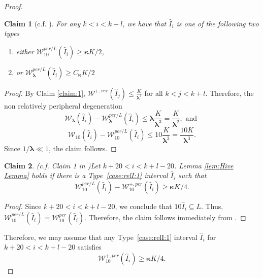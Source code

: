 \documentclass{amsart}
\newcommand{\1}{{\mathbb 1 }}
\newcommand{\blambda}{{\boldsymbol\lambda}}
\newcommand{\bkappa}{{\boldsymbol\kappa}}
\newcommand{\Width}{{\mathcal W}}
\newcommand{\wI}{{\widehat I}}
\newtheorem{claim}{Claim}
\theoremstyle{remark}
\numberwithin{equation}{section}
\theoremstyle{definition}
\begin{document}
\begin{proof}
\begin{claim}[c.f. {\cite[(1) and (2) of Lemma 8.6]{DL22}}]
    For any $k < i < k+l$, we have that $\wI_i$ is one of the following two types
    \begin{enumerate}[label=(\Roman*)]
        \item \label{case:relI:1} either $\Width^{per/L}_{10}(\wI_i) \geq \bkappa K/2$,
        \item \label{case:relI:2} or $\Width^{per/L}_{\blambda}(\wI_i) \geq C_\bkappa K/2$
    \end{enumerate}
\end{claim}
\begin{proof}
    By Claim \ref{claim:1}, $\Width^{+, ver}(\wI_j) \leq \frac{K}{\blambda^3}$ for all $k< j < k+l$. Therefore, the non relatively peripheral degeneration
    $$
    \Width_{\blambda}(\wI_i) - \Width^{per/L}_{\blambda}(\wI_i) \leq \blambda \frac{K}{\blambda^3} = \frac{K}{\blambda^2}, \text { and }
    $$
    $$
    \Width_{10}(\wI_i) - \Width^{per/L}_{10}(\wI_i) \leq 10 \frac{K}{\blambda^3} = \frac{10K}{\blambda^3}.
    $$
    Since $1/ \blambda \ll 1$, the claim follows.
\end{proof}

\begin{claim}(c.f. Claim 1 in \cite[\S 8.2]{DL22})\label{cl:seq:Type1}
    Let $k+20 < i < k+l - 20$. Lemma \ref{lem:Hive Lemma} holds if there is a Type~\ref{case:relI:1} interval $\wI_i$ such that
    $$
    \Width^{per/L}_{10}(\wI_i) - \Width^{+, per}_{10}(\wI_i) \geq \bkappa K/4.
    $$
\end{claim}
\begin{proof}
    Since $k+20 < i < k+l - 20$, we conclude that $10 \wI_i \subseteq L$. Thus, $\Width^{per/L}_{10}(\wI_i) = \Width^{per}_{10}(\wI_i)$. Therefore, the claim follows immediately from \cite[Lemma 6.8]{DL22}.
\end{proof}
Therefore, we may assume that any Type~\ref{case:relI:1} interval $\wI_i$ for $k+20 < i < k+l - 20$ satisfies 
$$
\Width^{+, per}_{10}(\wI_i) \geq \bkappa K/4.
$$




\end{proof}
\end{document}
